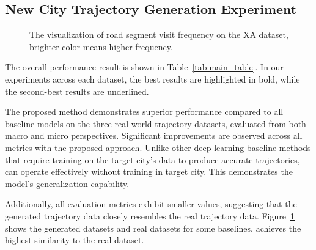 \subsection{New City Trajectory Generation Experiment}
\begin{figure}[t]
    \centering


    
    
    \caption{The visualization of road segment visit frequency on the XA dataset, brighter color means higher frequency.}
    \label{fig:loc_freq_visualize}
\end{figure}
The overall performance result is shown in Table~\ref{tab:main_table}. In our experiments across each dataset, the best results are highlighted in bold, while the second-best results are underlined. 

The proposed method demonstrates superior performance compared to all baseline models on the three real-world trajectory datasets, evaluated from both macro and micro perspectives. Significant improvements are observed across all metrics with the proposed approach. Unlike other deep learning baseline methods that require training on the target city’s data to produce accurate trajectories, \name can operate effectively without training in target city. This demonstrates the model’s generalization capability.

Additionally, all evaluation metrics exhibit smaller values, suggesting that the generated trajectory data closely resembles the real trajectory data. Figure~\ref{fig:loc_freq_visualize} shows the generated datasets and real datasets for some baselines. \name achieves the highest similarity to the real dataset.

